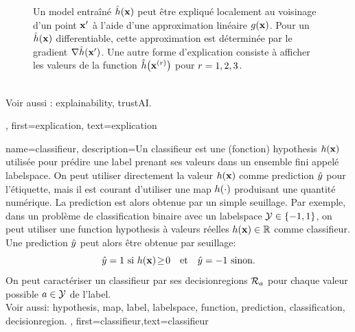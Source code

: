 {{\begin{figure}[htbp]
\begin{center}
			\end{center}
			\caption{Un \gls{model} entraîné $\hat{h}({\bf x})$ peut être expliqué localement 
				au voisinage d’un point ${\bf x}'$ à l’aide d’une approximation linéaire $g({\bf x})$. 
				Pour un $\hat{h}({\bf x})$ \gls{differentiable}, cette approximation est déterminée 
				par le \gls{gradient} $\nabla \hat{h}({\bf x}')$. Une autre forme d’explication consiste 
				à afficher les valeurs de la \gls{function} $\hat{h}\big({\bf x}^{(r)} \big)$ 
				pour $r=1,2,3$.}
			\label{fig_explanation_dict}
		\end{figure} 
		\\
		Voir aussi : \gls{explainability}, \gls{trustAI}.},
	first={explication},
	text={explication} 
}

{	name={classifieur},
	description={Un classifieur est une (fonction) \gls{hypothesis} $h({\bf x})$ utilisée pour prédire une \gls{label} prenant ses valeurs dans un ensemble fini appelé \gls{labelspace}. On peut utiliser directement la valeur $h({\bf x})$ comme \gls{prediction} $\hat{y}$ pour l’étiquette, mais il est courant d’utiliser une \gls{map} $h(\cdot)$ produisant une quantité numérique. La \gls{prediction} est alors obtenue par un simple seuillage. 		
		Par exemple, dans un problème de \gls{classification} binaire avec un \gls{labelspace} $\mathcal{Y} \in \{ -1,1 \}$, on peut utiliser une \gls{function} \gls{hypothesis} à valeurs réelles $h({\bf x}) \in \mathbb{R}$ comme classifieur. Une \gls{prediction} $\hat{y}$ peut alors être obtenue par seuillage:
		\begin{equation}
			\label{equ_def_threshold_bin_classifier_dict}
			\hat{y} =1 \text{ si } h({\bf x})\!\geq\!0 \quad \text{et} \quad \hat{y} = -1 \text{ sinon.}
		\end{equation}		
		On peut caractériser un classifieur par ses \glspl{decisionregion} $\mathcal{R}_{a}$ pour chaque valeur possible $a \in \mathcal{Y}$ de l’\gls{label}.
		\\ 
		Voir aussi: \gls{hypothesis}, \gls{map}, \gls{label}, \gls{labelspace}, \gls{function}, \gls{prediction}, \gls{classification}, \gls{decisionregion}.
	},
	first={classifieur},text={classifieur}
}

